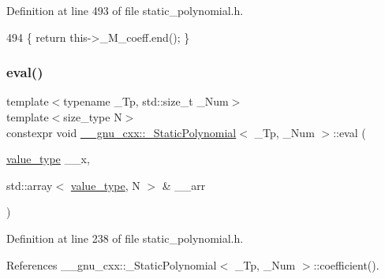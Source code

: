 Definition at line 493 of file static\+\_\+polynomial.\+h.


\begin{DoxyCode}
494       \{ \textcolor{keywordflow}{return} this->\_M\_coeff.end(); \}
\end{DoxyCode}
\mbox{\label{class____gnu__cxx_1_1__StaticPolynomial_a724e1d4553a8f93137bb93b9cae2e5f1}} 
\subsubsection{\texorpdfstring{eval()}{eval()}\hspace{0.1cm}{\footnotesize\ttfamily [1/2]}}
{\footnotesize\ttfamily template$<$typename \+\_\+\+Tp, std\+::size\+\_\+t \+\_\+\+Num$>$ \\
template$<$size\+\_\+type N$>$ \\
constexpr void \hyperlink{class____gnu__cxx_1_1__StaticPolynomial}{\+\_\+\+\_\+gnu\+\_\+cxx\+::\+\_\+\+Static\+Polynomial}$<$ \+\_\+\+Tp, \+\_\+\+Num $>$\+::eval (\begin{DoxyParamCaption}\item[{\hyperlink{class____gnu__cxx_1_1__StaticPolynomial_af23110f5a002cd6caa3542df7cf35284}{value\+\_\+type}}]{\+\_\+\+\_\+x,  }\item[{std\+::array$<$ \hyperlink{class____gnu__cxx_1_1__StaticPolynomial_af23110f5a002cd6caa3542df7cf35284}{value\+\_\+type}, N $>$ \&}]{\+\_\+\+\_\+arr }\end{DoxyParamCaption})\hspace{0.3cm}{\ttfamily [inline]}}



Definition at line 238 of file static\+\_\+polynomial.\+h.



References \+\_\+\+\_\+gnu\+\_\+cxx\+::\+\_\+\+Static\+Polynomial$<$ \+\_\+\+Tp, \+\_\+\+Num $>$\+::coefficient().



